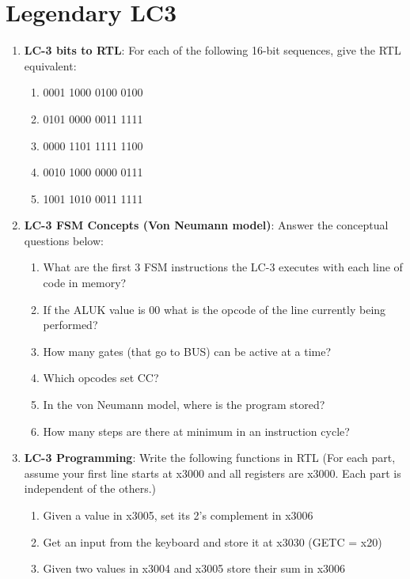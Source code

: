 \documentclass{article}
\begin{document}
\section{Legendary LC3}
    \begin{enumerate}[label=(\alph*)]
        \item \textbf{LC-3 bits to RTL}: For each of the following 16-bit sequences, give the RTL equivalent:
        \begin{enumerate}[label=(\roman*),itemsep = 10pt]
            \item 0001 1000 0100 0100
            \item 0101 0000 0011 1111
            \item 0000 1101 1111 1100 
            \item 0010 1000 0000 0111
            \item 1001 1010 0011 1111
        \end{enumerate}
        \newpage
        \item \textbf{LC-3 FSM Concepts (Von Neumann model)}: Answer the conceptual questions below:
        \begin{enumerate}[label=(\roman*),itemsep = 10pt]
            \item What are the first 3 FSM instructions the LC-3 executes with each line of code in memory?
            \item If the ALUK value is 00 what is the opcode of the line currently being performed?
            \item How many gates (that go to BUS) can be active at a time?
            \item Which opcodes set CC?
            \item In the von Neumann model, where is the program stored?
            \item How many steps are there at minimum in an instruction cycle?
        \end{enumerate}
        \item \textbf{LC-3 Programming}: Write the following functions in RTL (For each part, assume your first line starts at x3000 and all registers are x3000. Each part is independent of the others.)
        \begin{enumerate}[label=(\roman*),itemsep = 10pt]
            \item Given a value in x3005, set its 2’s complement in x3006
            \item Get an input from the keyboard and store it at x3030 (GETC = x20)
            \item Given two values in x3004 and x3005 store their sum in x3006

\end{enumerate}
\end{enumerate}
\end{document}
